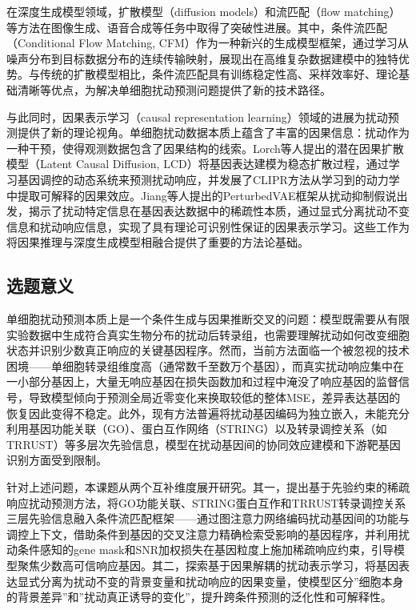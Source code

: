 在深度生成模型领域，扩散模型（diffusion models）和流匹配（flow matching）等方法在图像生成、语音合成等任务中取得了突破性进展\cite{ho2020denoising, song2020score}。其中，条件流匹配（Conditional Flow Matching, CFM）作为一种新兴的生成模型框架，通过学习从噪声分布到目标数据分布的连续传输映射，展现出在高维复杂数据建模中的独特优势\cite{lipman2022flow, liu2022flow}。与传统的扩散模型相比，条件流匹配具有训练稳定性高、采样效率好、理论基础清晰等优点，为解决单细胞扰动预测问题提供了新的技术路径\cite{huguet2024cellflow}。

与此同时，因果表示学习（causal representation learning）领域的进展为扰动预测提供了新的理论视角\cite{scholkopf2021toward}。单细胞扰动数据本质上蕴含了丰富的因果信息：扰动作为一种干预，使得观测数据包含了因果结构的线索。Lorch等人提出的潜在因果扩散模型（Latent Causal Diffusion, LCD）将基因表达建模为稳态扩散过程，通过学习基因调控的动态系统来预测扰动响应，并发展了CLIPR方法从学习到的动力学中提取可解释的因果效应\cite{lorch2025latent}。Jiang等人提出的PerturbedVAE框架从扰动抑制假说出发，揭示了扰动特定信息在基因表达数据中的稀疏性本质，通过显式分离扰动不变信息和扰动响应信息，实现了具有理论可识别性保证的因果表示学习\cite{jiang2025what}。这些工作为将因果推理与深度生成模型相融合提供了重要的方法论基础。

\subsection{选题意义}

单细胞扰动预测本质上是一个条件生成与因果推断交叉的问题：模型既需要从有限实验数据中生成符合真实生物分布的扰动后转录组，也需要理解扰动如何改变细胞状态并识别少数真正响应的关键基因程序。然而，当前方法面临一个被忽视的技术困境——单细胞转录组维度高（通常数千至数万个基因），而真实扰动响应集中在一小部分基因上，大量无响应基因在损失函数加和过程中淹没了响应基因的监督信号，导致模型倾向于预测全局近零变化来换取较低的整体MSE，差异表达基因的恢复因此变得不稳定。此外，现有方法普遍将扰动基因编码为独立嵌入，未能充分利用基因功能关联（GO）、蛋白互作网络（STRING）以及转录调控关系（如TRRUST）等多层次先验信息，模型在扰动基因间的协同效应建模和下游靶基因识别方面受到限制。

针对上述问题，本课题从两个互补维度展开研究。其一，提出基于先验约束的稀疏响应扰动预测方法，将GO功能关联、STRING蛋白互作和TRRUST转录调控关系三层先验信息融入条件流匹配框架——通过图注意力网络编码扰动基因间的功能与调控上下文，借助条件到基因的交叉注意力精确检索受影响的基因程序，并利用扰动条件感知的gene mask和SNR加权损失在基因粒度上施加稀疏响应约束，引导模型聚焦少数高可信响应基因。其二，探索基于因果解耦的扰动表示学习，将基因表达显式分离为扰动不变的背景变量和扰动响应的因果变量，使模型区分”细胞本身的背景差异”和”扰动真正诱导的变化”，提升跨条件预测的泛化性和可解释性。

